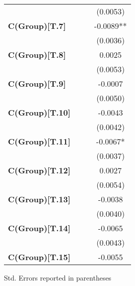 \begin{center}
\begin{tabular}{lccc}
\textbf{ }                     &                  &                  &     (0.0053)      \\
\textbf{C(Group)[T.7]}         &                  &                  &    -0.0089**      \\
\textbf{ }                     &                  &                  &     (0.0036)      \\
\textbf{C(Group)[T.8]}         &                  &                  &      0.0025       \\
\textbf{ }                     &                  &                  &     (0.0053)      \\
\textbf{C(Group)[T.9]}         &                  &                  &     -0.0007       \\
\textbf{ }                     &                  &                  &     (0.0050)      \\
\textbf{C(Group)[T.10]}        &                  &                  &     -0.0043       \\
\textbf{ }                     &                  &                  &     (0.0042)      \\
\textbf{C(Group)[T.11]}        &                  &                  &     -0.0067*      \\
\textbf{ }                     &                  &                  &     (0.0037)      \\
\textbf{C(Group)[T.12]}        &                  &                  &      0.0027       \\
\textbf{ }                     &                  &                  &     (0.0054)      \\
\textbf{C(Group)[T.13]}        &                  &                  &     -0.0038       \\
\textbf{ }                     &                  &                  &     (0.0040)      \\
\textbf{C(Group)[T.14]}        &                  &                  &     -0.0065       \\
\textbf{ }                     &                  &                  &     (0.0043)      \\
\textbf{C(Group)[T.15]}        &                  &                  &     -0.0055       \\
\bottomrule
\end{tabular}
\end{center}

Std. Errors reported in parentheses